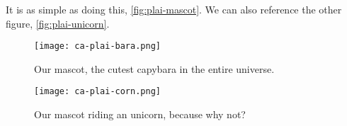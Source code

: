 It is as simple as doing this, \autoref{fig:plai-mascot}.
We can also reference the other figure, \autoref{fig:plai-unicorn}.


\begin{figure}[t]
    \begin{center}
        \texttt{[image: ca-plai-bara.png]}
    \end{center}
    \caption{Our mascot, the cutest capybara in the entire universe.}
    \label{fig:plai-mascot}
\end{figure}

\begin{figure}[b]
    \begin{center}
        \texttt{[image: ca-plai-corn.png]}
    \end{center}
    \caption{Our mascot riding an unicorn, because why not?}
    \label{fig:plai-unicorn}
\end{figure}
